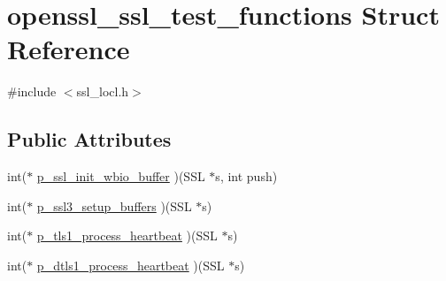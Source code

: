 \hypertarget{structopenssl__ssl__test__functions}{\section{openssl\-\_\-ssl\-\_\-test\-\_\-functions Struct Reference}
\label{structopenssl__ssl__test__functions}
}


{\ttfamily \#include $<$ssl\-\_\-locl.\-h$>$}

\subsection*{Public Attributes}
\begin{DoxyCompactItemize}
\item 
int($\ast$ \hyperlink{structopenssl__ssl__test__functions_a9410da54e3319fc7a98d8836b19b3873}{p\-\_\-ssl\-\_\-init\-\_\-wbio\-\_\-buffer} )(S\-S\-L $\ast$s, int push)
\item 
int($\ast$ \hyperlink{structopenssl__ssl__test__functions_a753245b1fcaa36783289c5683f50db1b}{p\-\_\-ssl3\-\_\-setup\-\_\-buffers} )(S\-S\-L $\ast$s)
\item 
int($\ast$ \hyperlink{structopenssl__ssl__test__functions_ac585c578d8f9c1098a995cdfe0b377ef}{p\-\_\-tls1\-\_\-process\-\_\-heartbeat} )(S\-S\-L $\ast$s)
\item 
int($\ast$ \hyperlink{structopenssl__ssl__test__functions_aff8637e33f16192b928dd8d13a0356eb}{p\-\_\-dtls1\-\_\-process\-\_\-heartbeat} )(S\-S\-L $\ast$s)
\end{DoxyCompactItemize}


